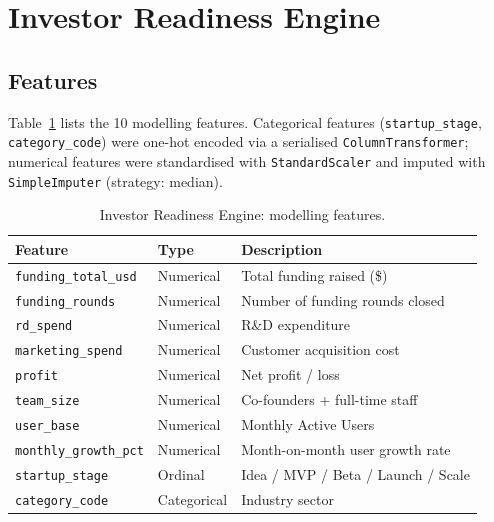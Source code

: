 \documentclass{article}
\begin{document}

\FloatBarrier
\section{Investor Readiness Engine}
\label{sec:investor}

\FloatBarrier
\subsection{Features}

Table~\ref{tab:features} lists the 10 modelling features. Categorical
features (\texttt{startup\_stage}, \texttt{category\_code}) were one-hot
encoded via a serialised \texttt{ColumnTransformer}; numerical features were
standardised with \texttt{StandardScaler} and imputed with
\texttt{SimpleImputer} (strategy: median).

\begin{table}[htbp]
\centering
\caption{Investor Readiness Engine: modelling features.}
\label{tab:features}
\small
\begin{tabular}{lll}
\toprule
\textbf{Feature} & \textbf{Type} & \textbf{Description} \\
\midrule
\texttt{funding\_total\_usd} & Numerical & Total funding raised (\$) \\
\texttt{funding\_rounds}     & Numerical & Number of funding rounds closed \\
\texttt{rd\_spend}           & Numerical & R\&D expenditure \\
\texttt{marketing\_spend}    & Numerical & Customer acquisition cost \\
\texttt{profit}              & Numerical & Net profit / loss \\
\texttt{team\_size}          & Numerical & Co-founders + full-time staff \\
\texttt{user\_base}          & Numerical & Monthly Active Users \\
\texttt{monthly\_growth\_pct}& Numerical & Month-on-month user growth rate \\
\texttt{startup\_stage}      & Ordinal    & Idea / MVP / Beta / Launch / Scale \\
\texttt{category\_code}      & Categorical & Industry sector \\
\bottomrule
\end{tabular}
\end{table}
\end{document}
